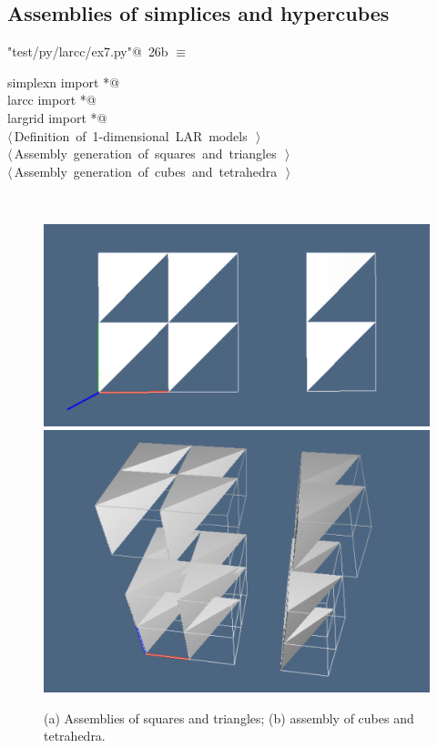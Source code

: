 \documentclass[11pt,oneside]{article}	%
\begin{document}
\subsection{Assemblies of simplices and hypercubes}

\begin{flushleft} \small
\begin{minipage}{\linewidth} \label{scrap65}
\protect{}\verb@"test/py/larcc/ex7.py"@\nobreak\ {\footnotesize 26b }$\equiv$
\vspace{-1ex}
\begin{list}{}{} \item
\mbox{}\verb@from simplexn import *@\\
\mbox{}\verb@from larcc import *@\\
\mbox{}\verb@from largrid import *@\\
\mbox{}\verb@@\hbox{$\langle\,$Definition of 1-dimensional LAR models\nobreak\ {\footnotesize {}}$\,\rangle$}\verb@@\\
\mbox{}\verb@@\hbox{$\langle\,$Assembly generation of squares and triangles\nobreak\ {\footnotesize {}}$\,\rangle$}\verb@@\\
\mbox{}\verb@@\hbox{$\langle\,$Assembly generation of cubes and tetrahedra\nobreak\ {\footnotesize {}}$\,\rangle$}\verb@@\\
\mbox{}\verb@@{\NWsep}
\end{list}
\vspace{-2ex}
\end{minipage}\\[4ex]
\end{flushleft}

\begin{figure}[htbp] %
   \centering
   \includegraphics[width=0.405\linewidth]{images/assembly1} 
   \includegraphics[width=0.315\linewidth]{images/assembly2} 
   \caption{(a) Assemblies of squares and triangles; (b) assembly of cubes and tetrahedra.}
   \label{fig:example}
\end{figure}
\end{document}
